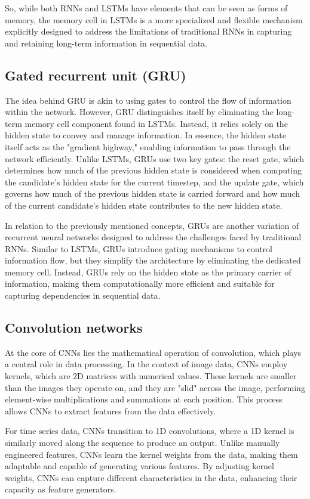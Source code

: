\documentclass{article}
\begin{document}
So, while both RNNs and LSTMs have elements that can be seen as forms of memory, the memory cell in LSTMs is a more specialized and flexible mechanism explicitly designed to address the limitations of traditional RNNs in capturing and retaining long-term information in sequential data.

\subsection{Gated recurrent unit (GRU)}
The idea behind GRU is akin to using gates to control the flow of information within the network. 
However, GRU distinguishes itself by eliminating the long-term memory cell component found in LSTMs. 
Instead, it relies solely on the hidden state to convey and manage information. 
In essence, the hidden state itself acts as the "gradient highway," enabling information to pass through the network efficiently. 
Unlike LSTMs, GRUs use two key gates: the reset gate, which determines how much of the previous hidden state is considered when computing the candidate's hidden state for the current timestep, and the update gate, which governs how much of the previous hidden state is carried forward and how much of the current candidate's hidden state contributes to the new hidden state.

In relation to the previously mentioned concepts, GRUs are another variation of recurrent neural networks designed to address the challenges faced by traditional RNNs. 
Similar to LSTMs, GRUs introduce gating mechanisms to control information flow, but they simplify the architecture by eliminating the dedicated memory cell. 
Instead, GRUs rely on the hidden state as the primary carrier of information, making them computationally more efficient and suitable for capturing dependencies in sequential data.


\subsection{Convolution networks}
At the core of CNNs lies the mathematical operation of convolution, which plays a central role in data processing. 
In the context of image data, CNNs employ kernels, which are 2D matrices with numerical values. 
These kernels are smaller than the images they operate on, and they are "slid" across the image, performing element-wise multiplications and summations at each position. 
This process allows CNNs to extract features from the data effectively.

For time series data, CNNs transition to 1D convolutions, where a 1D kernel is similarly moved along the sequence to produce an output. 
Unlike manually engineered features, CNNs learn the kernel weights from the data, making them adaptable and capable of generating various features. 
By adjusting kernel weights, CNNs can capture different characteristics in the data, enhancing their capacity as feature generators.
\end{document}
